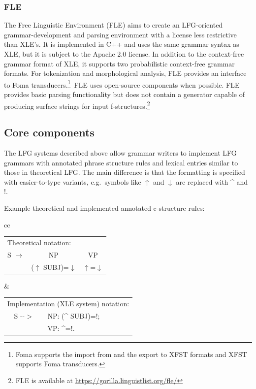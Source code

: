 \documentclass[output=paper,hidelinks]{langscibook}
\begin{document}
\subsubsection{FLE}

The Free Linguistic Environment (FLE) \citep{cavaretal16} aims to create an LFG-oriented grammar-development and parsing environment with a license less restrictive than XLE's. It is implemented in C++ and  uses the same grammar syntax as XLE, but it is subject to the Apache 2.0 license. In addition to the context-free grammar format of XLE, it supports two probabilistic context-free grammar formats. For tokenization and morphological analysis, FLE provides an interface to Foma transducers.\footnote{Foma supports the import from and the export to XFST formats and XFST supports Foma transducers.}\  FLE uses open-source components when possible. FLE provides basic parsing functionality but does not contain a generator capable of producing surface strings for input f-structures.\footnote{FLE is available at \url{https://gorilla.linguistlist.org/fle/}}


%
\subsection{Core components}
\label{sec:corecomponents}
  
  The LFG systems described above allow grammar writers to implement LFG grammars with annotated phrase structure rules and lexical entries similar to those in theoretical LFG.   The %
  main difference is that the formatting is %
  specified with easier-to-type variants, e.g.\ symbols like $\uparrow$ and $\downarrow$ are replaced  with {\textasciicircum} and !.

\ea Example theoretical and implemented annotated c-structure rules:\\[1ex]
\begin{tabular}[t]{cc}
    \begin{tabular}{@{}ccc@{}}
    \multicolumn{3}{l}{Theoretical notation:}\\
        S $\longrightarrow$ & NP & VP  \\
         & ($\uparrow$ SUBJ)=$\downarrow$ & $\uparrow$=$\downarrow$\\
    \end{tabular}
    &
    \begin{tabular}{cl}
    \multicolumn{2}{l}{Implementation (XLE system) notation:}\\
        S -{}-$>$ &  NP:  ({\textasciicircum} SUBJ)=!;\\
         & VP: \/ {\textasciicircum}=!. \\
    \end{tabular}
    \end{tabular}
\z
           
\end{document}
